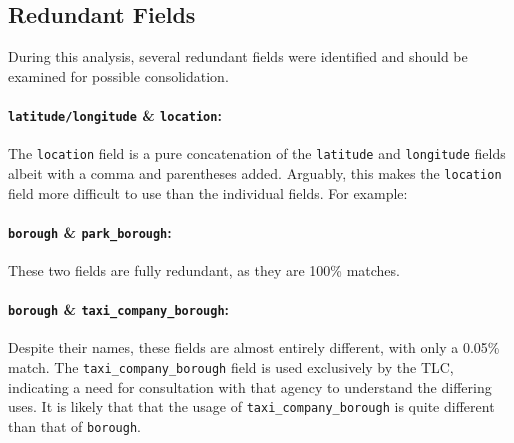 \documentclass[linenumber]{jdsart}
\begin{document}
\subsection{Redundant Fields}
\label{sec:duplicates}
During this analysis, several redundant fields were identified and should 
be examined for possible consolidation.

\paragraph{\texttt{latitude/longitude} \& \texttt{location}:} 
The \texttt{location} field is a pure concatenation of 
the \texttt{latitude} and \texttt{longitude} fields albeit with a 
comma and parentheses added. Arguably, this makes the \texttt{location} field 
more difficult to use than the individual fields. For example: 

\begin{center}
\end{center}

\paragraph{\texttt{borough} \& \texttt{park\_borough}:} These two fields are fully redundant, 
as they are 100\% matches.

\paragraph{\texttt{borough} \& \texttt{taxi\_company\_borough}:} Despite 
their names, these fields are almost entirely different, with only 
a 0.05\% match. The \texttt{taxi\_company\_borough} field is 
used exclusively by the TLC, indicating a need for consultation 
with that agency to understand the differing uses. It is 
likely that that the usage of \texttt{taxi\_company\_borough} is 
quite different than that of \texttt{borough}. 
\end{document}
